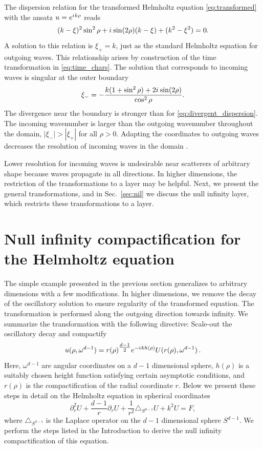 \documentclass[final,onefignum,onetabnum]{siamart190516}
\newcommand{\be}{\begin{equation}}
\newcommand{\ee}{\end{equation}}
\newcommand{\iu}{{i\mkern1mu}}
\begin{document}
The dispersion relation for the transformed Helmholtz equation \eqref{eq:transformed} with the ansatz $u=e^{\iu k \rho}$ reads
\[ (k-\xi)^2 \sin^2\rho + \iu \sin(2\rho) (k-\xi) + (k^2-\xi^2) = 0. \]
A solution to this relation is $\xi_+=k$, just as the standard Helmholtz equation for outgoing waves. This relationship arises by construction of the time transformation in \eqref{eq:time_chars}.
The solution that corresponds to incoming waves is singular at the outer boundary
\be\label{eq:incoming} \xi_-=-\frac{k(1+\sin^2\rho)+2\iu \sin(2\rho)}{\cos^2\rho}. \ee
The divergence near the boundary is stronger than for \eqref{eq:divergent_dispersion}. The incoming wavenumber is larger than the outgoing wavenumber throughout the domain, $|\xi_-|>|\xi_+|$ for all $\rho>0$. Adapting the coordinates to outgoing waves decreases the resolution of incoming waves in the domain \cite{calabrese2006asymptotically}. 

Lower resolution for incoming waves is undesirable near scatterers of arbitrary shape because waves propagate in all directions. In higher dimensions, the restriction of the transformations to a layer may be helpful. Next, we present the general transformations, and in Sec.~\ref{sec:nil} we discuss the null infinity layer, which restricts these transformations to a layer.

\section{Null infinity compactification for the Helmholtz equation}\label{sec:nic}
The simple example presented in the previous section generalizes to arbitrary dimensions with a few modifications. In higher dimensions, we remove the decay of the oscillatory solution to ensure regularity of the transformed equation. The transformation is performed along the outgoing direction towards infinity. We summarize the transformation with the following directive: Scale-out the oscillatory decay and compactify
\be\label{eq:summary} u(\rho, \omega^{d-1}) = r(\rho)^{\tfrac{d-1}{2}} e^{-\iu k h(\rho)} U(r(\rho), \omega^{d-1})\,.\ee
Here, $\omega^{d-1}$ are angular coordinates on a $d-1$ dimensional sphere, $h(\rho)$ is a suitably chosen height function satisfying certain asymptotic conditions, and $r(\rho)$ is the compactification of the radial coordinate $r$. Below we present these steps in detail on the Helmholtz equation in spherical coordinates
\begin{equation}\label{eq:helm_sph}
	\partial_r^2 U + \frac{d-1}{r} \partial_r U + \frac{1}{r^2}\triangle_{S^{d-1}} U + k^2 U = F,
\end{equation}
where $\triangle_{S^{d-1}}$ is the Laplace operator on the $d-1$ dimensional sphere $S^{d-1}$. We perform the steps listed in the Introduction to derive the null infinity compactification of this equation.
\end{document}
